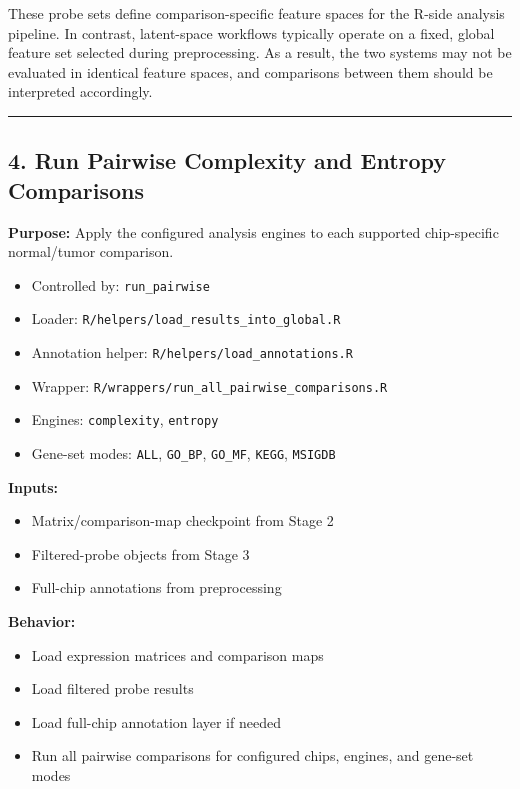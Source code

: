 \documentclass[
  letterpaper,
  DIV=11,
  numbers=noendperiod,
  openany,
  oneside]{scrreprt}
\providecommand{\tightlist}{%
  \setlength{\itemsep}{0pt}\setlength{\parskip}{0pt}}
\begin{document}
These probe sets define comparison-specific feature spaces for the
R-side analysis pipeline. In contrast, latent-space workflows typically
operate on a fixed, global feature set selected during preprocessing. As
a result, the two systems may not be evaluated in identical feature
spaces, and comparisons between them should be interpreted accordingly.

\begin{center}\rule{0.5\linewidth}{0.5pt}\end{center}

\subsection*{4. Run Pairwise Complexity and Entropy
Comparisons}\label{run-pairwise-complexity-and-entropy-comparisons}

\textbf{Purpose:} Apply the configured analysis engines to each
supported chip-specific normal/tumor comparison.

\begin{itemize}
\tightlist
\item
  Controlled by: \texttt{run\_pairwise}
\item
  Loader: \texttt{R/helpers/load\_results\_into\_global.R}
\item
  Annotation helper: \texttt{R/helpers/load\_annotations.R}
\item
  Wrapper: \texttt{R/wrappers/run\_all\_pairwise\_comparisons.R}
\item
  Engines: \texttt{complexity}, \texttt{entropy}
\item
  Gene-set modes: \texttt{ALL}, \texttt{GO\_BP}, \texttt{GO\_MF},
  \texttt{KEGG}, \texttt{MSIGDB}
\end{itemize}

\textbf{Inputs:}

\begin{itemize}
\tightlist
\item
  Matrix/comparison-map checkpoint from Stage 2
\item
  Filtered-probe objects from Stage 3
\item
  Full-chip annotations from preprocessing
\end{itemize}

\textbf{Behavior:}

\begin{itemize}
\tightlist
\item
  Load expression matrices and comparison maps
\item
  Load filtered probe results
\item
  Load full-chip annotation layer if needed
\item
  Run all pairwise comparisons for configured chips, engines, and
  gene-set modes
\end{itemize}
\end{document}

